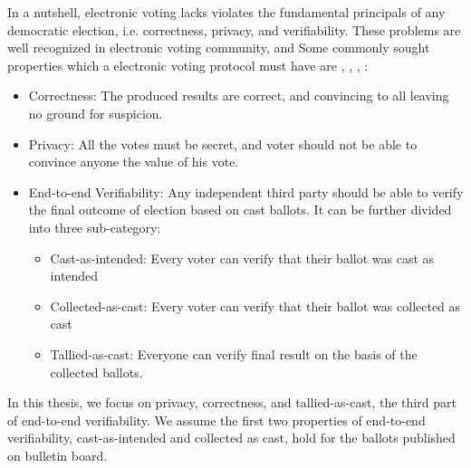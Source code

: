 	\noindent
	In a  nutshell, 
    electronic voting lacks violates the  fundamental principals of any democratic election, i.e.
    correctness, privacy, and verifiability. These problems are well recognized in electronic voting 
    community, 
   and Some commonly sought 
   properties which a electronic voting protocol must have are 
    \citep{5958051}, 
   \citep{Benaloh:1994:RSE:195058.195407},  \citep{Delaune:2010:VPT}, \citep{Bernhard:2017:PES}:
 \begin{itemize}
 
  \item Correctness:
 	The produced results are correct, and convincing to all leaving no  ground for suspicion. 
 	
 \item Privacy:
    All the votes must be secret, and voter should not be able to convince anyone the 
    value of his vote.
 
 \item End-to-end Verifiability:
 Any independent third party should be able to verify the final outcome of election based on cast 
 ballots.  It can be further divided into three sub-category:
 
 \begin{itemize}
  \item Cast-as-intended: Every voter can verify that their ballot was cast as
  intended
  \item Collected-as-cast: Every voter can verify that their ballot was collected as
  cast
  \item Tallied-as-cast: Everyone can verify final result on the basis of the
  collected ballots.
\end{itemize}
\end{itemize}
 	
   
In this thesis, we focus on privacy, correctness, and tallied-as-cast, the third part of end-to-end verifiability.
We assume the first two properties of end-to-end verifiability, cast-as-intended and collected as cast, hold
for the ballots published on bulletin board. 


